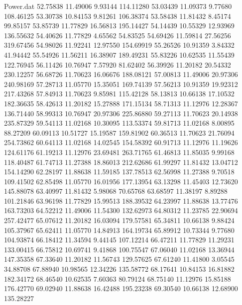 \begin{filecontents}{Power.dat}
  52.75838   11.49006    9.93144  114.11280
  53.03439   11.09373    9.77680  108.46125
  53.30738   10.84153    9.81261  106.38374
  53.58438   11.81432    8.45174   99.85157
  53.85739   11.77829   16.56813  195.14427
  54.14439   10.55329   12.93969  136.55632
  54.40626   11.77829    4.65562   54.83525
  54.69426   11.59814   27.56256  319.67456
  54.98026   11.92241   12.97550  154.69919
  55.26526   10.91359    3.84332   41.94442
  55.54926   11.56211   16.38907  189.49231
  55.83226   10.62535   11.55439  122.76945
  56.11426   10.76947    7.57920   81.62402
  56.39926   11.20182   20.54332  230.12257
  56.68726   11.70623   16.06676  188.08121
  57.00813   11.49006   20.97306  240.98169
  57.28713   11.05770   15.35051  169.74139
  57.56213   10.91359   19.92312  217.43268
  57.84913   11.70623    9.85981  115.42128
  58.13813   10.66138   17.10532  182.36635
  58.42613   11.20182   15.27888  171.15134
  58.71313   11.12976   12.28367  136.71440
  58.99313   10.76947   20.97306  225.86880
  59.27113   11.70623   20.14938  235.87329
  59.54113   11.02168   10.30095  113.53374
  59.81713   11.02168    8.00895   88.27209
  60.09113   10.51727   15.19587  159.81902
  60.36513   11.70623   21.76094  254.73862
  60.64113   11.02168   14.02545  154.58392
  60.91713   11.12976   11.19626  124.61176
  61.19213   11.12976   23.69481  263.71765
  61.46813   11.85035    9.99168  118.40487
  61.74713   11.27388   18.86013  212.62686
  61.99297   11.81432   13.04712  154.14290
  62.28197   11.88638   11.59185  137.78513
  62.56998   11.27388    9.70518  109.41502
  62.85498   11.05770   16.01956  177.13954
  63.13298   11.45403   12.73620  145.88078
  63.40997   11.81432    5.98068   70.65768
  63.68597   11.38197    8.89288  101.21846
  63.96198   11.77829   15.99513  188.39532
  64.23997   11.88638   13.77476  163.73203
  64.52212   11.49006   11.54300  132.62973
  64.80312   11.23785   22.90694  257.42477
  65.07612   11.20182   16.03094  179.57581
  65.34811   10.66138    9.88424  105.37967
  65.62411   11.05770   14.84913  164.19734
  65.89912   10.73344    9.77680  104.93874
  66.18412   11.34594    9.44145  107.12214
  66.47211   11.77829   11.29231  133.00415
  66.75812   10.69741    9.41868  100.75547
  67.06040   11.02168   13.36944  147.35358
  67.33640   11.20182   11.56743  129.57625
  67.61240   11.41800    3.05545   34.88708
  67.88940   10.98565   12.34226  135.58772
  68.17641   10.84153   16.81882  182.34172
  68.46540   10.62535    7.60363   80.79124
  68.75140   11.12976   15.85188  176.42770
  69.02940   11.88638   16.42488  195.23238
  69.30540   10.66138   12.68900  135.28227

\end{filecontents}
